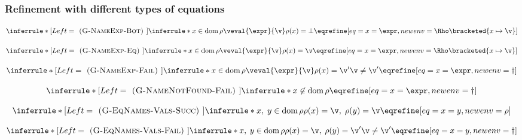 \documentclass[]{article}
\DeclareMathOperator{\dom}{dom}
\begin{document}
\subsubsection{Refinement with different types of equations}

\[
\inferrule*[Left=\textsc{ (G-NameExp-Bot) }]
    {\inferrule* {}
    {
    x \in \dom \rho
    \\\\
    \veval{\expr}{\v}
    \\\\
    \rho(x) = \bot
    }}
    {\eqrefine[eq={x = \expr},newenv=\Rho\bracketed{x \mapsto \v}]}
\]

\[
\inferrule*[Left=\textsc{ (G-NameExp-Eq) }]
    {\inferrule* {}
    {
    x \in \dom \rho
    \\\\
    \veval{\expr}{\v}
    \\\\
    \rho(x) = \v
    }}
    {\eqrefine[eq={x = \expr},newenv=\Rho\bracketed{x \mapsto \v}]}
\]

\[
\inferrule*[Left=\textsc{ (G-NameExp-Fail) }]
    {\inferrule* {}
    {
    x \in \dom \rho
    \\\\
    \veval{\expr}{\v}
    \\\\ 
    \rho(x) = \v'
    \\\\
    \v \neq \v'
    }}
    {\eqrefine[eq={x = \expr},newenv=\dagger]}
\]

\[
\inferrule*[Left=\textsc{ (G-NameNotFound-Fail) }]
    {\inferrule* {}
    {
    x \not\in \dom \rho
    }}
    {\eqrefine[eq={x = \expr},newenv=\dagger]}
\]

\[
\inferrule*[Left=\textsc{ (G-EqNames-Vals-Succ) }]
    {\inferrule* {}
    {
    x,\;y \in \dom \rho
    \\\\
    \rho(x) = \v, \; \rho(y) = \v
    }}
    {\eqrefine[eq={x = y},newenv=\rho]}
\]

\[
\inferrule*[Left=\textsc{ (G-EqNames-Vals-Fail) }]
    {\inferrule* {}
    {
    x,\;y \in \dom \rho
    \\\\
    \rho(x) = \v, \; \rho(y) = \v'
    \\\\
    \v \neq \v'}}
    {\eqrefine[eq={x = y},newenv=\dagger]}
\]

\end{document}
